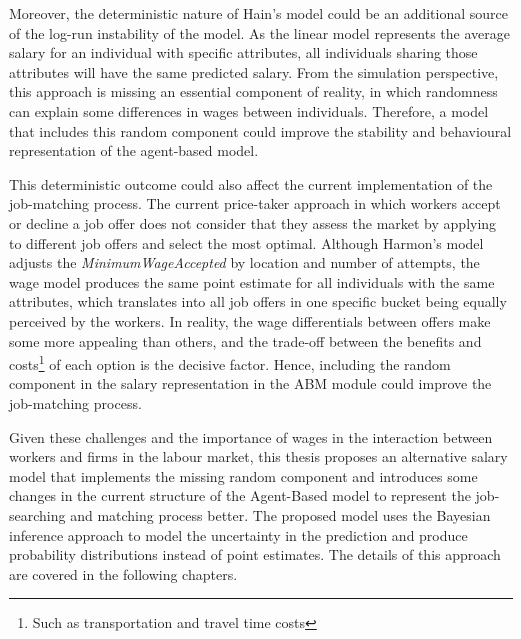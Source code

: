 Moreover, the deterministic nature of Hain's model could be an additional source of the log-run instability of the model. As the linear model represents the average salary for an individual with specific attributes, all individuals sharing those attributes will have the same predicted salary. From the simulation perspective, this approach is missing an essential component of reality, in which randomness can explain some differences in wages between individuals. Therefore, a model that includes this random component could improve the stability and behavioural representation of the agent-based model. 

This deterministic outcome could also affect the current implementation of the job-matching process. The current price-taker approach in which workers accept or decline a job offer does not consider that they assess the market by applying to different job offers and select the most optimal. Although Harmon's model adjusts the \textit{MinimumWageAccepted} by location and number of attempts, the wage model produces the same point estimate for all individuals with the same attributes, which translates into all job offers in one specific bucket being equally perceived by the workers. In reality, the wage differentials between offers make some more appealing than others, and the trade-off between the benefits and costs\footnote{Such as transportation and travel time costs} of each option is the decisive factor. Hence, including the random component in the salary representation in the ABM module could improve the job-matching process. 

Given these challenges and the importance of wages in the interaction between workers and firms in the labour market, this thesis proposes an alternative salary model that implements the missing random component and introduces some changes in the current structure of the Agent-Based model to represent the job-searching and matching process better. The proposed model uses the Bayesian inference approach to model the uncertainty in the prediction and produce probability distributions instead of point estimates. The details of this approach are covered in the following chapters. 